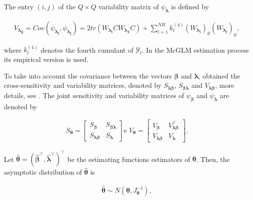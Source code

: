 \documentclass[article]{jss}\usepackage[]{graphicx}\usepackage[]{xcolor}
\begin{document}
\noindent The entry $(i,j)$ of the $Q \times Q$ variability matrix of $\psi_{\boldsymbol{\lambda}}$ is defined by

$$
  \begin{aligned}
V_{\boldsymbol{\lambda_{ij}}} = Cov\left ( \psi_{\boldsymbol{\lambda_{i}}}, \psi_{\boldsymbol{\lambda_{j}}} \right) = 2tr(W_{\boldsymbol{\lambda_{i}}} CW_{\boldsymbol{\lambda_{J}}} C) + \sum_{l=1}^{NR} k_{l}^{(4)} (W_{\boldsymbol{\lambda_{i}}})_{ll} (W_{\boldsymbol{\lambda_{j}}})_{ll},
  \end{aligned}
$$

\noindent where $k_{l}^{(4)}$ denotes the fourth cumulant of $\mathcal{Y}_{l}$. In the McGLM estimation process its empirical version is used.

To take into account the covariance between the vectors $\boldsymbol{\beta}$ and $\boldsymbol{\lambda}$, \citet{Bonat16} obtained the cross-sensitivity and variability matrices, denoted by $S_{\boldsymbol{\lambda \beta}}$, $S_{\boldsymbol{\beta \lambda}}$ and $V_{\boldsymbol{\lambda \beta}}$, more details, see \citet{Bonat16}. The joint sensitivity and variability matrices of $\psi_{\boldsymbol{\beta}}$ and $\psi_{\boldsymbol{\lambda}}$ are denoted by

$$
  \begin{aligned}
    S_{\boldsymbol{\theta}} = \begin{bmatrix}
      S_{\boldsymbol{\beta}} & S_{\boldsymbol{\beta\lambda}} \\ 
      S_{\boldsymbol{\lambda\beta}} & S_{\boldsymbol{\lambda}} 
      \end{bmatrix} \text{e } V_{\boldsymbol{\theta}} = \begin{bmatrix}
      V_{\boldsymbol{\beta}} & V^{\top}_{\boldsymbol{\lambda\beta}} \\ 
      V_{\boldsymbol{\lambda\beta}} & V_{\boldsymbol{\lambda}} 
    \end{bmatrix}.
  \end{aligned}
$$

Let $\boldsymbol{\hat{\theta}} = (\boldsymbol{\hat{\beta}^{\top}}, \boldsymbol{\hat{\lambda}^{\top}})^{\top}$ be the estimating functions estimators of $\boldsymbol{\theta}$. Then, the asymptotic distribution of $\boldsymbol{\hat{\theta}}$ is

$$
  \begin{aligned}
    \boldsymbol{\hat{\theta}} \sim N(\boldsymbol{\theta}, J_{\boldsymbol{\theta}}^{-1}),
  \end{aligned}
$$
\end{document}
